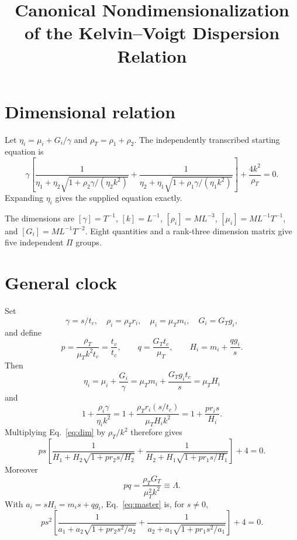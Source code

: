 \documentclass[11pt]{article}
\title{Canonical Nondimensionalization of the Kelvin--Voigt Dispersion Relation}
\author{}
\date{}
\begin{document}
\maketitle

\section{Dimensional relation}
Let $\eta_i=\mu_i+G_i/\gamma$ and $\rho_T=\rho_1+\rho_2$. The independently
transcribed starting equation is
\begin{equation}
\gamma\left[
\frac1{\eta_1+\eta_2\sqrt{1+\rho_2\gamma/(\eta_2k^2)}}+
\frac1{\eta_2+\eta_1\sqrt{1+\rho_1\gamma/(\eta_1k^2)}}
\right]+\frac{4k^2}{\rho_T}=0.\label{eq:dim}
\end{equation}
Expanding $\eta_i$ gives the supplied equation exactly.

The dimensions are $[\gamma]=T^{-1}$, $[k]=L^{-1}$,
$[\rho_i]=ML^{-3}$, $[\mu_i]=ML^{-1}T^{-1}$, and
$[G_i]=ML^{-1}T^{-2}$. Eight quantities and a rank-three dimension matrix give
five independent $\Pi$ groups.

\section{General clock}
Set
\[
\gamma=s/t_c,\quad \rho_i=\rho_Tr_i,\quad \mu_i=\mu_Tm_i,
\quad G_i=G_Tg_i,
\]
and define
\[
p=\frac{\rho_T}{\mu_Tk^2t_c}=\frac{t_v}{t_c},\qquad
q=\frac{G_Tt_c}{\mu_T},\qquad H_i=m_i+\frac{qg_i}{s}.
\]
Then
\[
\eta_i=\mu_i+\frac{G_i}{\gamma}
=\mu_Tm_i+\frac{G_Tg_it_c}{s}=\mu_TH_i
\]
and
\[
1+\frac{\rho_i\gamma}{\eta_i k^2}
=1+\frac{\rho_Tr_i(s/t_c)}{\mu_TH_i k^2}
=1+\frac{pr_is}{H_i}.
\]
Multiplying Eq.~\eqref{eq:dim} by $\rho_T/k^2$ therefore gives
\begin{equation}
ps\left[
\frac1{H_1+H_2\sqrt{1+pr_2s/H_2}}+
\frac1{H_2+H_1\sqrt{1+pr_1s/H_1}}
\right]+4=0.\label{eq:master}
\end{equation}
Moreover
\[
pq=\frac{\rho_TG_T}{\mu_T^2k^2}\equiv\Lambda.
\]
With $a_i=sH_i=m_is+qg_i$, Eq.~\eqref{eq:master} is, for $s\ne0$,
\begin{equation}
ps^2\left[
\frac1{a_1+a_2\sqrt{1+pr_2s^2/a_2}}+
\frac1{a_2+a_1\sqrt{1+pr_1s^2/a_1}}
\right]+4=0.\label{eq:cleared}
\end{equation}
\end{document}
